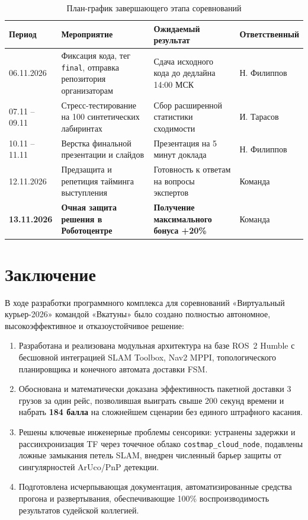 \documentclass[a4paper,11pt]{article}
\begin{document}
\begin{table}[htbp]
\centering
\small
\begin{tabularx}{\textwidth}{p{2.8cm}p{5.0cm}p{4.5cm}X}
\toprule
\textbf{Период} & \textbf{Мероприятие} & \textbf{Ожидаемый результат} & \textbf{Ответственный} \\
\midrule
06.11.2026 & Фиксация кода, тег \texttt{final}, отправка репозитория организаторам & Сдача исходного кода до дедлайна 14:00 МСК & Н. Филиппов \\
07.11 -- 09.11 & Стресс-тестирование на 100 синтетических лабиринтах & Сбор расширенной статистики сходимости & И. Тарасов \\
10.11 -- 11.11 & Верстка финальной презентации и слайдов & Презентация на 5 минут доклада & Н. Филиппов \\
12.11.2026 & Предзащита и репетиция тайминга выступления & Готовность к ответам на вопросы экспертов & Команда \\
\textbf{13.11.2026} & \textbf{Очная защита решения в Роботоцентре} & \textbf{Получение максимального бонуса +20\%} & Команда \\
\bottomrule
\end{tabularx}
\caption{План-график завершающего этапа соревнований}
\label{tab:roadmap}
\end{table}

\section{Заключение}
В ходе разработки программного комплекса для соревнований «Виртуальный курьер-2026» командой «Вкатуны» было создано полностью автономное, высокоэффективное и отказоустойчивое решение:
\begin{enumerate}
    \item Разработана и реализована модульная архитектура на базе ROS~2 Humble с бесшовной интеграцией SLAM Toolbox, Nav2 MPPI, топологического планировщика и конечного автомата доставки FSM.
    \item Обоснована и математически доказана эффективность пакетной доставки 3 грузов за один рейс, позволившая выиграть свыше 200 секунд времени и набрать \textbf{184 балла} на сложнейшем сценарии без единого штрафного касания.
    \item Решены ключевые инженерные проблемы сенсорики: устранены задержки и рассинхронизация TF через точечное облако \texttt{costmap\_cloud\_node}, подавлены ложные замыкания петель SLAM, внедрен численный барьер защиты от сингулярностей ArUco/PnP детекции.
    \item Подготовлена исчерпывающая документация, автоматизированные средства прогона и развертывания, обеспечивающие 100\% воспроизводимость результатов судейской коллегией.
\end{enumerate}
\end{document}

